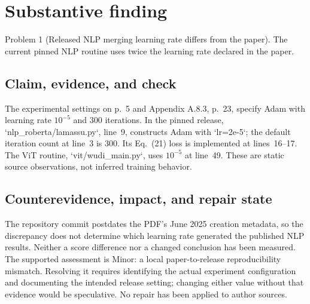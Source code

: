 \documentclass[10pt]{article}
\begin{document}
\section*{Substantive finding}
Problem 1 (Released NLP merging learning rate differs from the paper).  The current pinned NLP routine uses twice the learning rate declared in the paper.\par
\subsection*{Claim, evidence, and check}
The experimental settings on p. 5 and Appendix A.8.3, p. 23, specify Adam with learning rate \(10^{-5}\) and 300 iterations. In the pinned release, `nlp\_roberta/lamassu.py`, line 9, constructs Adam with `lr=2e-5`; the default iteration count at line 3 is 300. Its Eq. (21) loss is implemented at lines 16–17. The ViT routine, `vit/wudi\_main.py`, uses \(10^{-5}\) at line 49. These are static source observations, not inferred training behavior.\par
\subsection*{Counterevidence, impact, and repair state}
The repository commit postdates the PDF’s June 2025 creation metadata, so the discrepancy does not determine which learning rate generated the published NLP results. Neither a score difference nor a changed conclusion has been measured. The supported assessment is Minor: a local paper-to-release reproducibility mismatch. Resolving it requires identifying the actual experiment configuration and documenting the intended release setting; changing either value without that evidence would be speculative. No repair has been applied to author sources.\par
\end{document}

